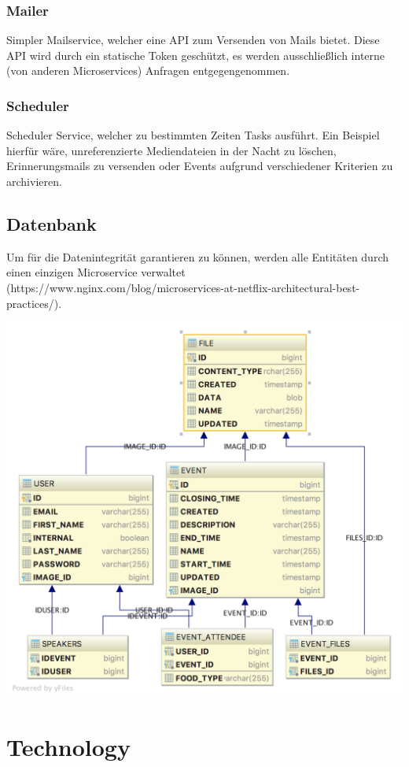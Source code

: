 \documentclass[11pt]{article} %
\begin{document}
\subsubsection{Mailer}
	Simpler Mailservice, welcher eine API zum Versenden von Mails bietet. Diese API wird durch ein statische Token geschützt, es werden ausschließlich interne (von anderen Microservices) Anfragen entgegengenommen.

\subsubsection{Scheduler}
	Scheduler Service, welcher zu bestimmten Zeiten Tasks ausführt. Ein Beispiel hierfür wäre, unreferenzierte  Mediendateien in der Nacht zu löschen, Erinnerungsmails zu versenden oder Events aufgrund verschiedener Kriterien zu archivieren.

\newpage
\subsection{Datenbank}
Um für die Datenintegrität garantieren zu können, werden alle Entitäten durch einen einzigen Microservice verwaltet (https://www.nginx.com/blog/microservices-at-netflix-architectural-best-practices/).

\includegraphics[width=1\textwidth]{dbSchema}

\newpage
\section{Technology}
\end{document}

